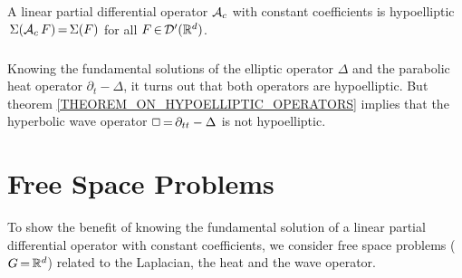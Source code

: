 \documentclass[11pt,twoside]{article}
\begin{document}
\begin{theorem}\label{THEOREM_ON_HYPOELLIPTIC_OPERATORS}
A linear partial differential operator ${\mathcal{A}}_c$ with constant coefficients
is hypoelliptic
\iff
$\,\Sigma({\mathcal{A}}_c \, F) {\,=\,} \Sigma(F)$ for all $F {\,\in\,} {\mathcal{D}}'({\mathbb{R}}^d)$.
\end{theorem}

\subparagraph{}
Knowing the fundamental solutions of the elliptic operator $\Delta$ and
the parabolic heat operator $\partial_t-\Delta$,
it turns out that both operators are hypoelliptic.
But theorem \ref{THEOREM_ON_HYPOELLIPTIC_OPERATORS} implies
that the hyperbolic wave operator $\Box {\,=\,} \partial_{tt}-\Delta$
is not hypoelliptic.

\section{Free Space Problems}                                                  %
To show the benefit of knowing the fundamental solution
of a linear partial differential operator with constant coefficients,
we consider free space problems ($G {\,=\,} {\mathbb{R}}^d$)
related to the Laplacian, the heat and the wave operator.
\end{document}
